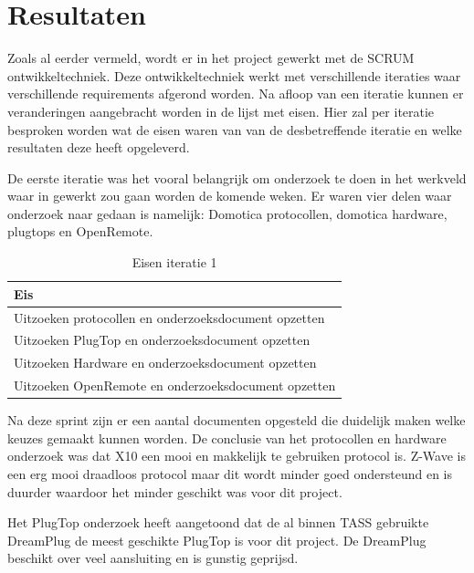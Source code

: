 \documentclass[]{article}
\begin{document}
\newpage
\section{Resultaten}

Zoals al eerder vermeld, wordt er in het project gewerkt met de SCRUM
ontwikkeltechniek. Deze ontwikkeltechniek werkt met verschillende iteraties
waar verschillende requirements afgerond worden. Na afloop van een iteratie
kunnen er veranderingen aangebracht worden in de lijst met eisen. Hier zal
per iteratie besproken worden wat de eisen waren van van de desbetreffende
iteratie en welke resultaten deze heeft opgeleverd.

De eerste iteratie was het vooral belangrijk om onderzoek te doen in het
werkveld waar in gewerkt zou gaan worden de komende weken. Er waren vier
delen waar onderzoek naar gedaan is namelijk: Domotica protocollen,
domotica hardware, plugtops en OpenRemote.
  
\begin{table}[htpb]
  \caption{Eisen iteratie 1}
  \begin{center}
    \begin{tabular}{|| l ||}\hline
        Eis                                                  \\\hline\hline
        Uitzoeken protocollen en onderzoeksdocument opzetten \\\hline
        Uitzoeken PlugTop en onderzoeksdocument opzetten     \\\hline
        Uitzoeken Hardware en onderzoeksdocument opzetten    \\\hline
        Uitzoeken OpenRemote en onderzoeksdocument opzetten  \\\hline
    \end{tabular}
  \end{center}
\end{table}

Na deze sprint zijn er een aantal documenten opgesteld die duidelijk maken
welke keuzes gemaakt kunnen worden. De conclusie van het protocollen en
hardware onderzoek was dat X10 een mooi en makkelijk te gebruiken protocol
is. Z-Wave is een erg mooi draadloos protocol maar dit wordt minder goed
ondersteund en is duurder waardoor het minder geschikt was voor dit
project.

Het PlugTop onderzoek heeft aangetoond dat de al binnen TASS gebruikte
DreamPlug de meest geschikte PlugTop is voor dit project. De DreamPlug
beschikt over veel aansluiting en is gunstig geprijsd.
\end{document}
